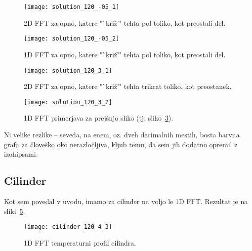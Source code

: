 \documentclass[a4 paper, 12pt]{article}
\begin{document}
\begin{figure}[H]\centering
    \texttt{[image: solution\_120\_-05\_1]}
    \vspace{-32pt}
    \caption{2D FFT za opno, katere "`kri\v z'" tehta pol toliko, kot preostali del.}
    \vspace{-18pt}
    \label{gr6}
\end{figure}

\begin{figure}[H]\centering
    \texttt{[image: solution\_120\_-05\_2]}
    \vspace{-32pt}
    \caption{1D FFT za opno, katere "`kri\v z'" tehta pol toliko, kot preostali del.}
    \vspace{-18pt}
    \label{gr7}
\end{figure}

\begin{figure}[H]\centering
    \texttt{[image: solution\_120\_3\_1]}
    \vspace{-32pt}
    \caption{2D FFT za opno, katere "`kri\v z'" tehta trikrat toliko, kot preostanek.}
    \vspace{-18pt}
    \label{gr8}
\end{figure}

\begin{figure}[H]\centering
    \texttt{[image: solution\_120\_3\_2]}
    \vspace{-32pt}
    \caption{1D FFT primerjava za prej\v snjo sliko (tj. sliko~\ref{gr8}).}
    \vspace{-8pt}
    \label{gr9}
\end{figure}

Ni velike rezlike -- seveda, na enem, oz. dveh decimalnih mestih, bosta barvna grafa za \v clove\v sko
oko nerazlo\v cljiva, kljub temu, da sem jih dodatno opremil z izohipsami.

\subsection{Cilinder}

Kot sem povedal v uvodu, imamo za cilinder na voljo le 1D FFT. Rezultat je na sliki~\ref{gr10}.

\begin{figure}[H]\centering
    \texttt{[image: cilinder\_120\_4\_3]}
    \vspace{-32pt}
    \caption{1D FFT temperaturni profil cilindra.}
    \vspace{-8pt}
    \label{gr10}
\end{figure}
\end{document}
